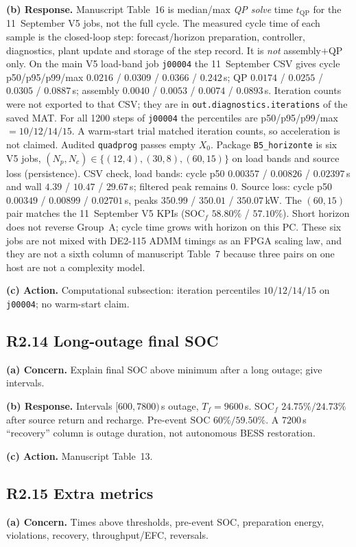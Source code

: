 \documentclass[11pt]{article}
\begin{document}
\textbf{(b) Response.} Manuscript Table~16 is median/max \emph{QP solve} time $t_{\mathrm{QP}}$ for the 11~September V5 jobs, not the full cycle. The measured cycle time of each sample is the closed-loop step: forecast/horizon preparation, controller, diagnostics, plant update and storage of the step record. It is \emph{not} assembly$+$QP only. On the main V5 load-band job \texttt{j00004} the 11~September CSV gives cycle p50/p95/p99/max $0.0216$ / $0.0309$ / $0.0366$ / $0.242$\,s; QP $0.0174$ / $0.0255$ / $0.0305$ / $0.0887$\,s; assembly $0.0040$ / $0.0053$ / $0.0074$ / $0.0893$\,s. Iteration counts were not exported to that CSV; they are in \texttt{out.diagnostics.iterations} of the saved MAT. For all 1200 steps of \texttt{j00004} the percentiles are p50/p95/p99/max $= 10/12/14/15$. A warm-start trial matched iteration counts, so acceleration is not claimed. Audited \texttt{quadprog} passes empty $X_0$. Package \texttt{B5\_horizonte} is six V5 jobs, $(N_p,N_c)\in\{(12,4),(30,8),(60,15)\}$ on load bands and source loss (persistence). CSV check, load bands: cycle p50 $0.00357$ / $0.00826$ / $0.02397$\,s and wall $4.39$ / $10.47$ / $29.67$\,s; filtered peak remains 0. Source loss: cycle p50 $0.00349$ / $0.00899$ / $0.02701$\,s, peaks $350.99$ / $350.01$ / $350.07$\,kW. The $(60,15)$ pair matches the 11~September V5 KPIs (SOC$_f$ $58.80\%$ / $57.10\%$). Short horizon does not reverse Group~A; cycle time grows with horizon on this PC. These six jobs are not mixed with DE2-115 ADMM timings as an FPGA scaling law, and they are not a sixth column of manuscript Table~7 because three pairs on one host are not a complexity model.

\textbf{(c) Action.} Computational subsection: iteration percentiles $10/12/14/15$ on \texttt{j00004}; no warm-start claim.

\subsection*{R2.14 Long-outage final SOC}
\textbf{(a) Concern.} Explain final SOC above minimum after a long outage; give intervals.

\textbf{(b) Response.} Intervals $[600,7800)$\,s outage, $T_f=9600$\,s. SOC$_f$ $24.75\%/24.73\%$ after source return and recharge. Pre-event SOC $60\%/59.50\%$. A $7200$\,s ``recovery'' column is outage duration, not autonomous BESS restoration.

\textbf{(c) Action.} Manuscript Table~13.

\subsection*{R2.15 Extra metrics}
\textbf{(a) Concern.} Times above thresholds, pre-event SOC, preparation energy, violations, recovery, throughput/EFC, reversals.
\end{document}
